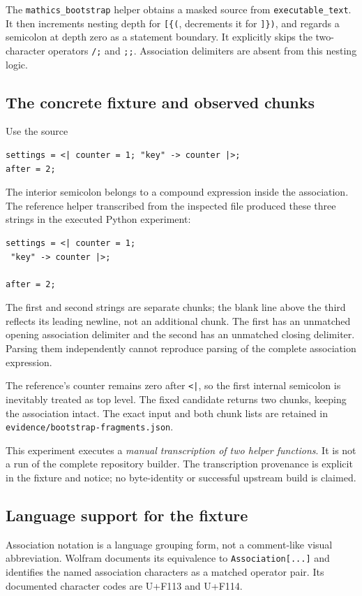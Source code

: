 \documentclass[11pt,letterpaper]{article}
\newcommand{\code}[1]{\nolinkurl{#1}}
\begin{document}
The \code{mathics_bootstrap} helper obtains a masked source from \code{executable_text}. It then increments nesting depth for \texttt{[\{(}, decrements it for \texttt{]\})}, and regards a semicolon at depth zero as a statement boundary. It explicitly skips the two-character operators \code{/;} and \code{;;}. Association delimiters are absent from this nesting logic.\cite{builder}

\subsection{The concrete fixture and observed chunks}
Use the source
\begin{lstlisting}
settings = <| counter = 1; "key" -> counter |>;
after = 2;
\end{lstlisting}
The interior semicolon belongs to a compound expression inside the association. The reference helper transcribed from the inspected file produced these three strings in the executed Python experiment:
\begin{lstlisting}
settings = <| counter = 1;
 "key" -> counter |>;

after = 2;
\end{lstlisting}
The first and second strings are separate chunks; the blank line above the third reflects its leading newline, not an additional chunk. The first has an unmatched opening association delimiter and the second has an unmatched closing delimiter. Parsing them independently cannot reproduce parsing of the complete association expression.

The reference's counter remains zero after \code{<|}, so the first internal semicolon is inevitably treated as top level. The fixed candidate returns two chunks, keeping the association intact. The exact input and both chunk lists are retained in \code{evidence/bootstrap-fragments.json}.

This experiment executes a \emph{manual transcription of two helper functions}. It is not a run of the complete repository builder. The transcription provenance is explicit in the fixture and notice; no byte-identity or successful upstream build is claimed.

\subsection{Language support for the fixture}
Association notation is a language grouping form, not a comment-like visual abbreviation. Wolfram documents its equivalence to \code{Association[...]} and identifies the named association characters as a matched operator pair. Its documented character codes are U+F113 and U+F114.\cite{association,leftassociation,rightassociation}
\end{document}

